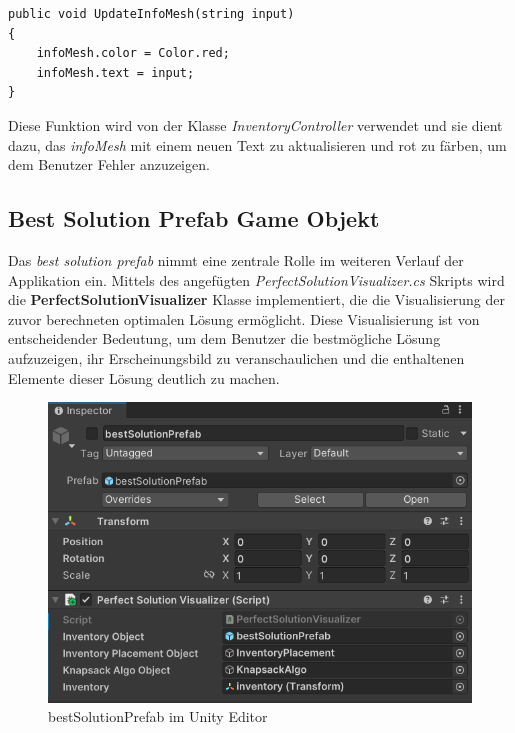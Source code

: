 \begin{lstlisting}[style=csharp, caption={Funktion um InfoMesh zu verändern}]
public void UpdateInfoMesh(string input)
{
    infoMesh.color = Color.red;
    infoMesh.text = input;
}
\end{lstlisting}
Diese Funktion wird von der Klasse \textit{InventoryController} verwendet und sie dient dazu, das \textit{infoMesh} mit
einem neuen Text zu aktualisieren und rot zu färben, um dem Benutzer Fehler anzuzeigen.

\subsection{Best Solution Prefab Game Objekt} 
Das \textit{best solution prefab} nimmt eine zentrale Rolle im weiteren Verlauf der Applikation ein. Mittels des angefügten
\textit{PerfectSolutionVisualizer.cs} Skripts wird die \textbf{PerfectSolutionVisualizer} Klasse implementiert, die die
Visualisierung der zuvor berechneten optimalen Lösung ermöglicht. Diese Visualisierung ist von entscheidender Bedeutung,
um dem Benutzer die bestmögliche Lösung aufzuzeigen, ihr Erscheinungsbild zu veranschaulichen und die enthaltenen Elemente
dieser Lösung deutlich zu machen.
\begin{figure}[H]
    \centering
    \includegraphics[scale=0.8]{images/bestSolPref_Editor}
    \caption{bestSolutionPrefab im Unity Editor}
    \label{fig:bestSol_Editor}
\end{figure}


